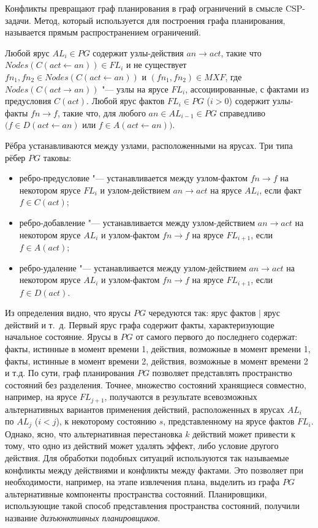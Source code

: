 \documentclass[b5paper,11pt]{book}
\begin{document}
	Конфликты превращают граф планирования в граф ограничений в смысле CSP-задачи. Метод, который используется для построения графа планирования, называется прямым распространением ограничений.
	
	Любой ярус $AL_i\in PG$ содержит узлы-действия $an\rightarrow act$, такие что $Nodes(C(act\leftarrow an))\in FL_i$ и не существует $fn_1,fn_2\in Nodes(C(act\leftarrow an))$ и $(fn_1, fn_2)\in MXF$, где $Nodes(C(act\rightarrow an))$ "--- узлы на ярусе $FL_i$, ассоциированные, с фактами из предусловия $C(act)$. Любой ярус фактов $FL_i\in PG$ ($i>0$) содержит узлы-факты $fn\rightarrow f$, такие что, для любого $an\in AL_{i-1}\in PG$ справедливо $(f\in D(act\leftarrow an)$ или $f\in A(act\leftarrow an))$.
	
	Рёбра устанавливаются между узлами, расположенными на ярусах. Три типа рёбер $PG$ таковы:
	\begin{itemize}
		\item ребро-предусловие "--- устанавливается между узлом-фактом $fn\rightarrow f$ на некотором ярусе $FL_i$ и узлом-действием $an\rightarrow act$ на ярусе $AL_i$, если факт $f\in C(act)$;
		\item ребро-добавление "--- устанавливается между узлом-действием $an\rightarrow act$ на некотором ярусе $AL_i$ и узлом-фактом $fn\rightarrow f$ на ярусе $FL_{i+1}$, если $f\in A(act)$;
		\item ребро-удаление "--- устанавливается между узлом-действием $an\rightarrow act$ на некотором ярусе $AL_i$ и узлом-фактом $fn\rightarrow f$ на ярусе $FL_{i+1}$, если $f\in D(act)$.
	\end{itemize}

	Из определения видно, что ярусы $PG$ чередуются так: ярус фактов $|$ ярус действий и т.~д. Первый ярус графа содержит факты, характеризующие начальное состояние. Ярусы в $PG$ от самого первого до последнего содержат: факты, истинные в момент времени 1, действия, возможные в момент времени 1, факты, истинные в момент времени 2, действия, возможные в момент времени 2 и т.д. По сути, граф планирования $PG$ позволяет представлять пространство состояний без разделения. Точнее, множество состояний хранящиеся совместно, например, на ярусе $FL_{j+1}$, получаются в результате всевозможных альтернативных вариантов применения действий, расположенных в ярусах $AL_i$ по $AL_j$ ($i<j$), к некоторому состоянию $s$, представленному на ярусе фактов $FL_i$. Однако, ясно, что альтернативная перестановка $k$ действий может привести к тому, что одно из действий может удалять эффект, либо условие другого действия. Для обработки подобных ситуаций используются так называемые  конфликты между действиями и конфликты между фактами. Это позволяет при необходимости, например, на этапе извлечения плана, выделить из графа $PG$ альтернативные компоненты пространства состояний. Планировщики, использующие такой способ представления пространства состояний, получили название \textit{дизъюнктивных планировщиков}. 
	
\end{document}
